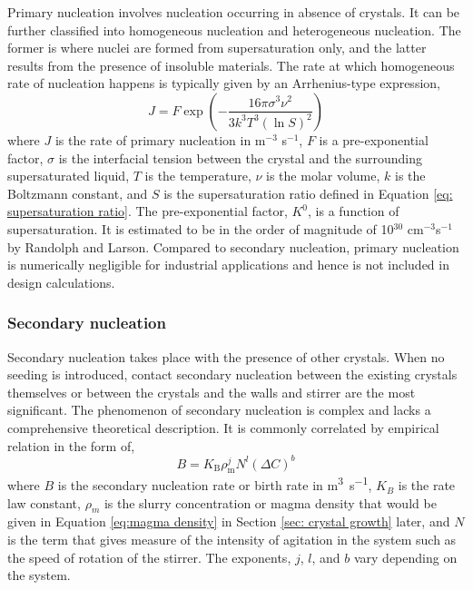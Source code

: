 Primary nucleation involves nucleation occurring in absence of crystals. \cite{seader_separation_2011} It can be further classified into homogeneous nucleation and heterogeneous nucleation. The former is where nuclei are formed from supersaturation only, and the latter results from the presence of insoluble materials. \cite{richardson_chemical_2006} The rate at which homogeneous rate of nucleation happens is typically given by an Arrhenius-type expression, \cite{richardson_chemical_2006}
\begin{equation}
     J = F\exp\left(-\frac{16 \pi \sigma^3 \nu^2}{3 k^3 T^3 (\ln S)^2}\right)
\end{equation}
where $J$ is the rate of primary nucleation in m$^{-3}$ s$^{-1}$, $F$ is a pre-exponential factor, $\sigma$ is the interfacial tension between the crystal and the surrounding supersaturated liquid, $T$ is the temperature, $\nu$ is the molar volume, $k$ is the Boltzmann constant, and $S$ is the supersaturation ratio defined in Equation \ref{eq: supersaturation ratio}. The pre-exponential factor, $K^0$, is a function of supersaturation. It is estimated to be in the order of magnitude of 10$^{30}$ cm$^{-3}$s$^{-1}$ by Randolph and Larson. \cite{randolph_theory_1971} Compared to secondary nucleation, primary nucleation is numerically negligible for industrial applications and hence is not included in design calculations. 

\subsubsection{Secondary nucleation}\label{sec:secondary nucleation}

Secondary nucleation takes place with the presence of other crystals. \cite{richardson_chemical_2006} When no seeding is introduced, contact secondary nucleation between the existing crystals themselves or between the crystals and the walls and stirrer are the most significant. \cite{richardson_chemical_2006} The phenomenon of secondary nucleation is complex and lacks a comprehensive theoretical description. It is commonly correlated by empirical relation in the form of, \cite{seader_separation_2011}
\begin{equation} \label{eq:secondary nucleation general}
    B = K_{\mathrm{B}} \rho^j_{\mathrm{m}} N^l (\Delta C)^b 
\end{equation}
where $B$ is the secondary nucleation rate or birth rate in \si{\cubic\m\per\s}, $K_B$ is the rate law constant, $\rho_m$ is the slurry concentration or magma density that would be given in Equation \ref{eq:magma density} in Section \ref{sec: crystal growth} later, and $N$ is the term that gives measure of the intensity of agitation in the system such as the speed of rotation of the stirrer. The exponents, $j$, $l$, and $b$ vary depending on the system.

